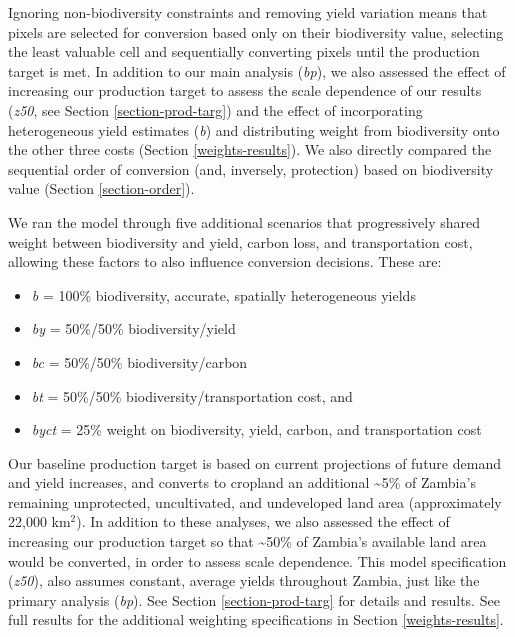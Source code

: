 \documentclass[
]{article}
\providecommand{\tightlist}{%
  \setlength{\itemsep}{0pt}\setlength{\parskip}{0pt}}
\begin{document}
Ignoring non-biodiversity constraints and removing yield variation means that pixels are selected for conversion based only on their biodiversity value, selecting the least valuable cell and sequentially converting pixels until the production target is met. In addition to our main analysis (\emph{bp}), we also assessed the effect of increasing our production target to assess the scale dependence of our results (\emph{z50}, see Section \ref{section-prod-targ}) and the effect of incorporating heterogeneous yield estimates (\emph{b}) and distributing weight from biodiversity onto the other three costs (Section \ref{weights-results}). We also directly compared the sequential order of conversion (and, inversely, protection) based on biodiversity value (Section \ref{section-order}).

We ran the model through five additional scenarios that progressively shared weight between biodiversity and yield, carbon loss, and transportation cost, allowing these factors to also influence conversion decisions. These are:

\begin{itemize}
\tightlist
\item
  \emph{b} = 100\% biodiversity, accurate, spatially heterogeneous yields
\item
  \emph{by} = 50\%/50\% biodiversity/yield
\item
  \emph{bc} = 50\%/50\% biodiversity/carbon
\item
  \emph{bt} = 50\%/50\% biodiversity/transportation cost, and
\item
  \emph{byct} = 25\% weight on biodiversity, yield, carbon, and transportation cost
\end{itemize}

Our baseline production target is based on current projections of future demand and yield increases, and converts to cropland an additional \textasciitilde5\% of Zambia's remaining unprotected, uncultivated, and undeveloped land area (approximately 22,000 km\(^2\)). In addition to these analyses, we also assessed the effect of increasing our production target so that \textasciitilde50\% of Zambia's available land area would be converted, in order to assess scale dependence. This model specification (\emph{z50}), also assumes constant, average yields throughout Zambia, just like the primary analysis (\emph{bp}). See Section \ref{section-prod-targ} for details and results. See full results for the additional weighting specifications in Section \ref{weights-results}.
\end{document}
